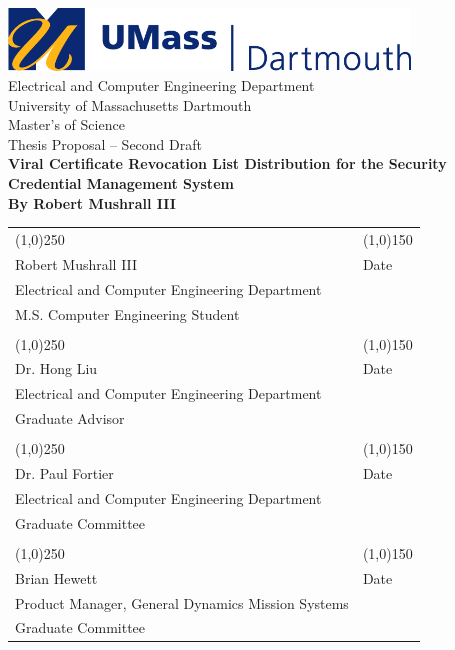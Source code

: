 \documentclass {article}
\begin{document}

\begin{titlepage}
	\centering
	\includegraphics[width=0.8\textwidth]{images/umd_logo.jpg} \\ \bigskip
	\LARGE{Electrical and Computer Engineering Department \\University of Massachusetts Dartmouth}\\
	\bigskip 
	\LARGE{Master's of Science \\ Thesis Proposal -- Second Draft} \\
	\bigskip 
	\Huge{\bf Viral Certificate Revocation List Distribution for the Security Credential Management System} \\ \medskip
	\LARGE{\bf By Robert Mushrall III}

	\vfill
	\begin{table}[!hb]
		\centering
		\begin{tabular}{ l l }
			\line(1,0){250} & \line(1,0){150} \\
			\small{Robert Mushrall III}  & \small{Date} \\
			\small{Electrical and Computer Engineering Department} \\
			\small{M.S. Computer Engineering Student} & \\
			\vspace{.3cm} \\
			\line(1,0){250} & \line(1,0){150} \\
			\small{Dr. Hong Liu} & \small{Date} \\
			\small{Electrical and Computer Engineering Department} \\
			\small{Graduate Advisor} & \\
			\vspace{.3cm} \\
			\line(1,0){250} & \line(1,0){150} \\
			\small{Dr. Paul Fortier} & \small{Date} \\
			\small{Electrical and Computer Engineering Department} \\
			\small{Graduate Committee} & \\
			\vspace{.3cm} \\
			\line(1,0){250} & \line(1,0){150} \\
			\small{Brian Hewett} & \small{Date} \\
			\small{Product Manager, General Dynamics Mission Systems} \\
			\small{Graduate Committee} & \\
		\end{tabular}
	\end{table}
	\thispagestyle{empty}
\end{titlepage}
\setcounter{page}{2}
\end{document}
